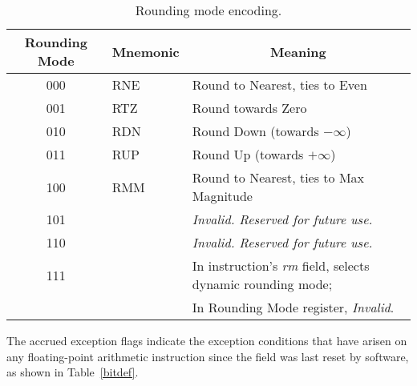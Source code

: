 \begin{table}[htp]
\begin{small}
\begin{center}
\begin{tabular}{ccl}
\hline
\multicolumn{1}{|c|}{Rounding Mode} &
\multicolumn{1}{c|}{Mnemonic} &
\multicolumn{1}{c|}{Meaning} \\
\hline
\multicolumn{1}{|c|}{000} &
\multicolumn{1}{l|}{RNE} &
\multicolumn{1}{l|}{Round to Nearest, ties to Even}\\
\hline
\multicolumn{1}{|c|}{001} &
\multicolumn{1}{l|}{RTZ} &
\multicolumn{1}{l|}{Round towards Zero}\\
\hline
\multicolumn{1}{|c|}{010} &
\multicolumn{1}{l|}{RDN} &
\multicolumn{1}{l|}{Round Down (towards $-\infty$)}\\
\hline
\multicolumn{1}{|c|}{011} &
\multicolumn{1}{l|}{RUP} &
\multicolumn{1}{l|}{Round Up (towards $+\infty$)}\\
\hline
\multicolumn{1}{|c|}{100} &
\multicolumn{1}{l|}{RMM} &
\multicolumn{1}{l|}{Round to Nearest, ties to Max Magnitude}\\
\hline
\multicolumn{1}{|c|}{101} &
\multicolumn{1}{l|}{} &
\multicolumn{1}{l|}{\em Invalid.  Reserved for future use.}\\
\hline
\multicolumn{1}{|c|}{110} &
\multicolumn{1}{l|}{} &
\multicolumn{1}{l|}{\em Invalid.  Reserved for future use.}\\
\hline
\multicolumn{1}{|c|}{111} &
\multicolumn{1}{l|}{} &
\multicolumn{1}{l|}{In instruction's {\em rm} field, selects dynamic rounding mode;}\\
\multicolumn{1}{|c|}{} &
\multicolumn{1}{l|}{} &
\multicolumn{1}{l|}{In Rounding Mode register, {\em Invalid}.}\\
\hline
\end{tabular}
\end{center}
\end{small}
\caption{Rounding mode encoding.}
\label{rm}
\end{table}

The accrued exception flags indicate the exception conditions that
have arisen on any floating-point arithmetic instruction since the
field was last reset by software, as shown in Table~\ref{bitdef}.

